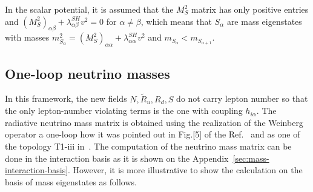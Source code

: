 In the scalar potential, it is assumed that the $M_{S}^{2}$ matrix has only
positive entries and $\left(M_S^2 \right)_{\alpha\beta}+\lambda^{SH}_{\alpha\beta}v^2=0$ for $\alpha\ne\beta$,  which means that $S_\alpha$ are mass eigenstates with masses $m_{S_{\alpha}}^{2}=\left({M}_S^2 \right)_{\alpha\alpha}+\lambda^{SH}_{\alpha\alpha}v^2$ and $m_{S_\alpha}<m_{S_{\alpha+1}}$.
%







\subsection{One-loop neutrino masses}
\label{sec:one-loop masees}
%
In this framework, the new fields $N,\widetilde{R}_u,R_d,S$ do not carry lepton number so that the
only lepton-number violating terms is the one with coupling $h_{i\alpha}$. 
The radiative neutrino mass matrix is obtained 
using the realization of the Weinberg operator a one-loop {\color{blue} how it was pointed out in Fig.[5] of the Ref.~\cite{Ma:1998dn} and as one of the topology T1-iii in~\cite{Bonnet:2012kz}}. 
The computation of the neutrino mass matrix can be done in the interaction basis as it is shown on the Appendix~\ref{sec:mass-interaction-basis}.
However, it is more illustrative to show the calculation on the basis of mass eigenstates as follows.

